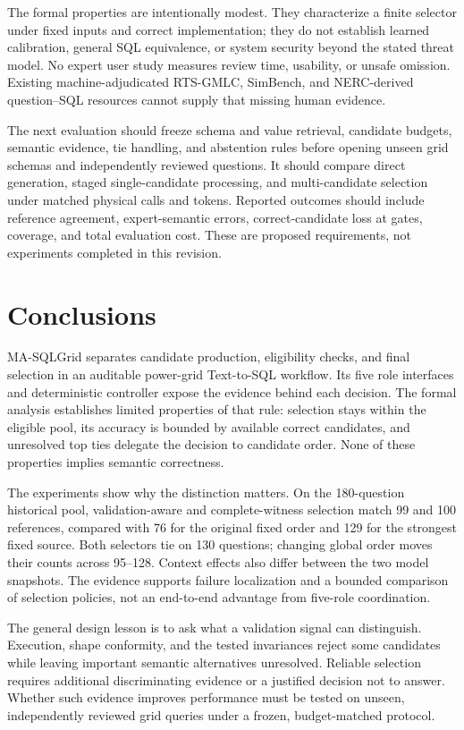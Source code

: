 \documentclass[information,article,submit,moreauthors]{Definitions/mdpi}
\newcommand{\masql}{MA-SQLGrid}
\begin{document}
The formal properties are intentionally modest. They characterize a finite selector under fixed inputs and correct implementation; they do not establish learned calibration, general SQL equivalence, or system security beyond the stated threat model. No expert user study measures review time, usability, or unsafe omission. Existing machine-adjudicated RTS-GMLC, SimBench, and NERC-derived question--SQL resources cannot supply that missing human evidence.

The next evaluation should freeze schema and value retrieval, candidate budgets, semantic evidence, tie handling, and abstention rules before opening unseen grid schemas and independently reviewed questions. It should compare direct generation, staged single-candidate processing, and multi-candidate selection under matched physical calls and tokens. Reported outcomes should include reference agreement, expert-semantic errors, correct-candidate loss at gates, coverage, and total evaluation cost. These are proposed requirements, not experiments completed in this revision.

\section{Conclusions}

\masql{} separates candidate production, eligibility checks, and final selection in an auditable power-grid Text-to-SQL workflow. Its five role interfaces and deterministic controller expose the evidence behind each decision. The formal analysis establishes limited properties of that rule: selection stays within the eligible pool, its accuracy is bounded by available correct candidates, and unresolved top ties delegate the decision to candidate order. None of these properties implies semantic correctness.

The experiments show why the distinction matters. On the 180-question historical pool, validation-aware and complete-witness selection match 99 and 100 references, compared with 76 for the original fixed order and 129 for the strongest fixed source. Both selectors tie on 130 questions; changing global order moves their counts across 95--128. Context effects also differ between the two model snapshots. The evidence supports failure localization and a bounded comparison of selection policies, not an end-to-end advantage from five-role coordination.

The general design lesson is to ask what a validation signal can distinguish. Execution, shape conformity, and the tested invariances reject some candidates while leaving important semantic alternatives unresolved. Reliable selection requires additional discriminating evidence or a justified decision not to answer. Whether such evidence improves performance must be tested on unseen, independently reviewed grid queries under a frozen, budget-matched protocol.
\end{document}
